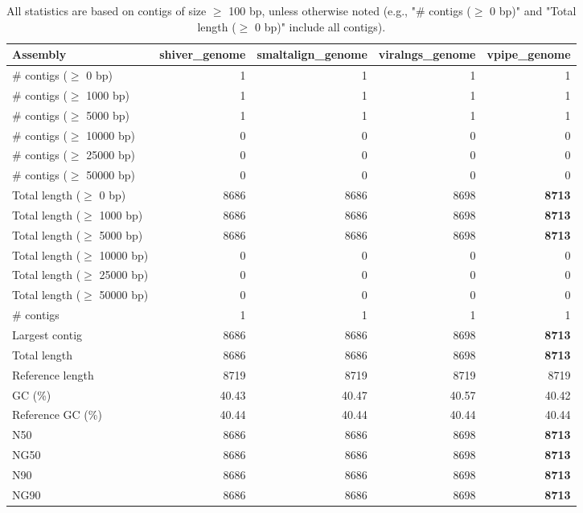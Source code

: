 \documentclass[12pt,a4paper]{article}
\begin{document}
\begin{table}[ht]
\begin{center}
\caption{All statistics are based on contigs of size $\geq$ 100 bp, unless otherwise noted (e.g., "\# contigs ($\geq$ 0 bp)" and "Total length ($\geq$ 0 bp)" include all contigs).}
\begin{tabular}{|l*{4}{|r}|}
\hline
Assembly & shiver\_genome & smaltalign\_genome & viralngs\_genome & vpipe\_genome \\ \hline
\# contigs ($\geq$ 0 bp) & 1 & 1 & 1 & 1 \\ \hline
\# contigs ($\geq$ 1000 bp) & 1 & 1 & 1 & 1 \\ \hline
\# contigs ($\geq$ 5000 bp) & 1 & 1 & 1 & 1 \\ \hline
\# contigs ($\geq$ 10000 bp) & 0 & 0 & 0 & 0 \\ \hline
\# contigs ($\geq$ 25000 bp) & 0 & 0 & 0 & 0 \\ \hline
\# contigs ($\geq$ 50000 bp) & 0 & 0 & 0 & 0 \\ \hline
Total length ($\geq$ 0 bp) & 8686 & 8686 & 8698 & {\bf 8713} \\ \hline
Total length ($\geq$ 1000 bp) & 8686 & 8686 & 8698 & {\bf 8713} \\ \hline
Total length ($\geq$ 5000 bp) & 8686 & 8686 & 8698 & {\bf 8713} \\ \hline
Total length ($\geq$ 10000 bp) & 0 & 0 & 0 & 0 \\ \hline
Total length ($\geq$ 25000 bp) & 0 & 0 & 0 & 0 \\ \hline
Total length ($\geq$ 50000 bp) & 0 & 0 & 0 & 0 \\ \hline
\# contigs & 1 & 1 & 1 & 1 \\ \hline
Largest contig & 8686 & 8686 & 8698 & {\bf 8713} \\ \hline
Total length & 8686 & 8686 & 8698 & {\bf 8713} \\ \hline
Reference length & 8719 & 8719 & 8719 & 8719 \\ \hline
GC (\%) & 40.43 & 40.47 & 40.57 & 40.42 \\ \hline
Reference GC (\%) & 40.44 & 40.44 & 40.44 & 40.44 \\ \hline
N50 & 8686 & 8686 & 8698 & {\bf 8713} \\ \hline
NG50 & 8686 & 8686 & 8698 & {\bf 8713} \\ \hline
N90 & 8686 & 8686 & 8698 & {\bf 8713} \\ \hline
NG90 & 8686 & 8686 & 8698 & {\bf 8713} \\ \hline

\end{tabular}
\end{center}
\end{table}
\end{document}
